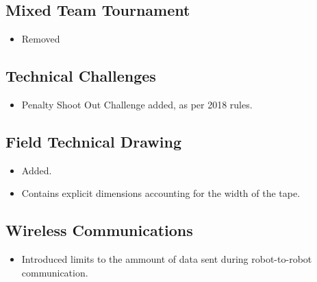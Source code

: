 \subsection*{Mixed Team Tournament}
\begin{itemize}
  \item Removed
\end{itemize}

\subsection*{Technical Challenges}
\begin{itemize}
  \item Penalty Shoot Out Challenge added, as per 2018 rules.
\end{itemize}

\subsection*{Field Technical Drawing}
\begin{itemize}
  \item Added.
  \item Contains explicit dimensions accounting for the width of the tape.
\end{itemize}

\subsection*{Wireless Communications}
\begin{itemize}
  \item Introduced limits to the ammount of data sent during robot-to-robot communication.
\end{itemize}
